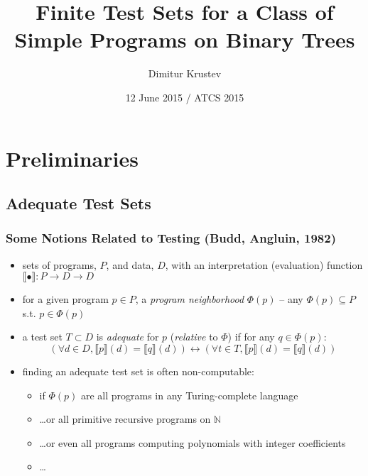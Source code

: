 \documentclass{beamer}
\title[Tests for Simple Programs on Trees]
  {Finite Test Sets for a Class of Simple Programs on Binary Trees}
\author{Dimitur Krustev}
\institute[IGE+XAO Balkan]
{
  IGE+XAO Balkan \\ \vspace{0.3cm} \pgfuseimage{mylogo1}
}
\date[ATCS 2015]{12 June 2015 / ATCS 2015}
\begin{document}
\begin{frame}
\maketitle
\end{frame}

\begin{frame}[Outline]
  \tableofcontents
\end{frame}

\section{Preliminaries}

\subsection{Adequate Test Sets}

\begin{frame}
  \frametitle{Some Notions Related to Testing (Budd, Angluin, 1982)}
  \begin{itemize}
    \item sets of programs, $P$, and data, $D$, with an interpretation (evaluation) function 
      $\llbracket \bullet \rrbracket : P \rightarrow D \rightarrow D$
    \item for a given program $p \in P$, a \emph{program neighborhood} $\Phi(p)$ -- any
      $\Phi(p) \subseteq P$ s.t. $p \in \Phi(p)$
    \item a test set $T \subset D$ is \emph{adequate} for $p$ (\emph{relative} to $\Phi$)
      if for any $q \in \Phi(p)$:
      \[(\forall d \in D, \llbracket p \rrbracket (d) = \llbracket q \rrbracket (d))
        \leftrightarrow 
        (\forall t \in T, \llbracket p \rrbracket (d) = \llbracket q \rrbracket (d))
      \]
    \item finding an adequate test set is often non-computable:
      \begin{itemize}
        \item if $\Phi(p)$ are all programs in any Turing-complete language
        \item \ldots or all primitive recursive programs on $\mathbb{N}$
        \item \ldots or even all programs computing polynomials with integer coefficients 
        \item \ldots
      \end{itemize}
  \end{itemize}
\end{frame}
\end{document}
